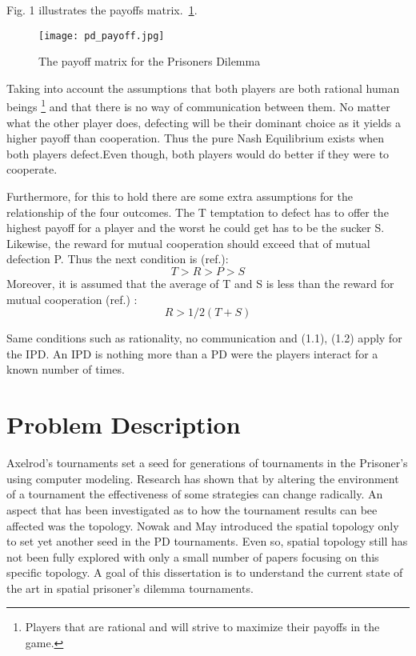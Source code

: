Fig. 1 illustrates the payoffs matrix.~\ref{fig:pd_payoff}.

\begin{figure}[h!]
\centering
\texttt{[image: pd\_payoff.jpg]}
\caption{The payoff matrix for the Prisoners Dilemma \parencite{Li2011}}
\label{fig:pd_payoff}
\end{figure}

Taking into account the assumptions that both players are both rational human
beings \footnote{Players that are rational and will strive to maximize
their payoffs in the game.}
and that there is no way of communication between them. No matter what the
other player does, defecting will be their dominant choice as it yields a higher
payoff than cooperation.
Thus the pure Nash Equilibrium exists when both players defect.Even though, both
players would do better if they were to cooperate.

Furthermore, for this to hold there are some extra assumptions for the relationship
of the four outcomes. The T temptation to defect has to offer the highest payoff for
a player and the worst he could get has to be the sucker S. Likewise, the
reward for mutual cooperation should exceed that of mutual defection P. Thus the
next condition is (ref.):
\begin{equation}
 T > R > P > S
\end{equation}
Moreover, it is assumed that the average of T and S is less than the reward for
mutual cooperation (ref.) :
\begin{equation}
R > 1/2(T+S)
\end{equation}

Same conditions such as rationality, no communication and (1.1), (1.2) apply for
the IPD. An IPD is nothing more than a PD were the players interact for a known
number of times.

\section{Problem Description}

Axelrod's tournaments set a seed for generations of tournaments in the Prisoner's
using computer modeling. Research has shown that by altering the environment of
a tournament the effectiveness of some strategies can change radically. An aspect
that has been investigated as to how the tournament results can bee affected was
the topology. Nowak and May introduced the spatial topology only to set yet another
seed in the PD tournaments. Even so, spatial topology still has not been fully
explored with only a small number of papers focusing on this specific topology.
A goal of this dissertation is to understand the current state of the art in
spatial prisoner’s dilemma tournaments.

